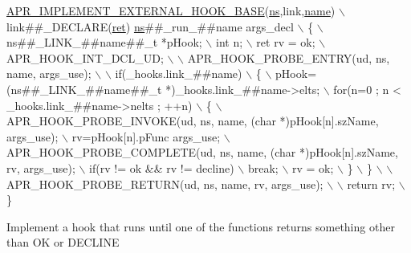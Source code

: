 \begin{DoxyCode}
\hyperlink{group__APR__Util__Hook_ga2500abadaa54b3a9d6ec25ff33a6b0cc}{APR\_IMPLEMENT\_EXTERNAL\_HOOK\_BASE}(\hyperlink{group__APR__Util__MC_ga5529c7c3562faf89fa1c2f6104033406}{ns},link,\hyperlink{group__APACHE__CORE__CONFIG_ga06e97fb366205b8f170da3c7562a8677}{name}) \(\backslash\)
link##\_DECLARE(\hyperlink{group__APACHE__MPM_ga794c48ec324a4d85a40f38fe264d2a41}{ret}) \hyperlink{group__APR__Util__MC_ga5529c7c3562faf89fa1c2f6104033406}{ns}\textcolor{preprocessor}{##\_run\_##name args\_decl \(\backslash\)}
\textcolor{preprocessor}{    \{ \(\backslash\)}
\textcolor{preprocessor}{    ns##\_LINK\_##name##\_t *pHook; \(\backslash\)}
\textcolor{preprocessor}{    int n; \(\backslash\)}
\textcolor{preprocessor}{    ret rv = ok; \(\backslash\)}
\textcolor{preprocessor}{    APR\_HOOK\_INT\_DCL\_UD; \(\backslash\)}
\textcolor{preprocessor}{\(\backslash\)}
\textcolor{preprocessor}{    APR\_HOOK\_PROBE\_ENTRY(ud, ns, name, args\_use); \(\backslash\)}
\textcolor{preprocessor}{\(\backslash\)}
\textcolor{preprocessor}{    if(\_hooks.link\_##name) \(\backslash\)}
\textcolor{preprocessor}{        \{ \(\backslash\)}
\textcolor{preprocessor}{        pHook=(ns##\_LINK\_##name##\_t *)\_hooks.link\_##name->elts; \(\backslash\)}
\textcolor{preprocessor}{        for(n=0 ; n < \_hooks.link\_##name->nelts ; ++n) \(\backslash\)}
\textcolor{preprocessor}{            \{ \(\backslash\)}
\textcolor{preprocessor}{            APR\_HOOK\_PROBE\_INVOKE(ud, ns, name, (char *)pHook[n].szName, args\_use); \(\backslash\)}
\textcolor{preprocessor}{            rv=pHook[n].pFunc args\_use; \(\backslash\)}
\textcolor{preprocessor}{            APR\_HOOK\_PROBE\_COMPLETE(ud, ns, name, (char *)pHook[n].szName, rv, args\_use); \(\backslash\)}
\textcolor{preprocessor}{            if(rv != ok && rv != decline) \(\backslash\)}
\textcolor{preprocessor}{                break; \(\backslash\)}
\textcolor{preprocessor}{            rv = ok; \(\backslash\)}
\textcolor{preprocessor}{            \} \(\backslash\)}
\textcolor{preprocessor}{        \} \(\backslash\)}
\textcolor{preprocessor}{\(\backslash\)}
\textcolor{preprocessor}{    APR\_HOOK\_PROBE\_RETURN(ud, ns, name, rv, args\_use); \(\backslash\)}
\textcolor{preprocessor}{\(\backslash\)}
\textcolor{preprocessor}{    return rv; \(\backslash\)}
\textcolor{preprocessor}{    \}}
\end{DoxyCode}
Implement a hook that runs until one of the functions returns something other than OK or D\+E\+C\+L\+I\+NE 
